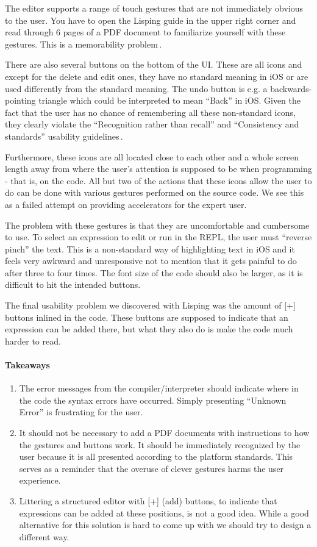 The editor supports a range of touch gestures that are not immediately obvious to the user. You have to open the Lisping guide in the upper right corner and read through 6 pages of a PDF document to familiarize yourself with these gestures. This is a memorability problem\,\cite{nielsen1990heuristic}.

There are also several buttons on the bottom of the UI. These are all icons and except for the delete and edit ones, they have no standard meaning in iOS or are used differently from the standard meaning. The undo button is e.g. a backwards-pointing triangle which could be interpreted to mean “Back” in iOS. Given the fact that the user has no chance of remembering all these non-standard icons, they clearly violate the ``Recognition rather than recall'' and ``Consistency and standards'' usability guidelines\,\cite{nielsen1990heuristic}. 

Furthermore, these icons are all located close to each other and a whole screen length away from where the user's attention is supposed to be when programming - that is, on the code. All but two of the actions that these icons allow the user to do can be done with various gestures performed on the source code. We see this as a failed attempt on providing accelerators for the expert user.

The problem with these gestures is that they are uncomfortable and cumbersome to use. To select an expression to edit or run in the REPL, the user must ``reverse pinch'' the text. This is a non-standard way of highlighting text in iOS and it feels very awkward and unresponsive not to mention that it gets painful to do after three to four times. The font size of the code should also be larger, as it is difficult to hit the intended buttons.

The final usability problem we discovered with Lisping was the amount of [+] buttons inlined in the code. These buttons are supposed to indicate that an expression can be added there, but what they also do is make the code much harder to read. 

\paragraph{Takeaways}
\begin{enumerate}
	\item The error messages from the compiler/interpreter should indicate where in the code the syntax errors have occurred. Simply presenting “Unknown Error” is frustrating for the user.
	\item It should not be necessary to add a PDF documents with instructions to how the gestures and buttons work. It should be immediately recognized by the user because it is all presented according to the platform standards. This serves as a reminder that the overuse of clever gestures harms the user experience.
	\item Littering a structured editor with [+] (add) buttons, to indicate that expressions can be added at these positions, is not a good idea. While a good alternative for this solution is hard to come up with we should try to design a different way.
\end{enumerate}



